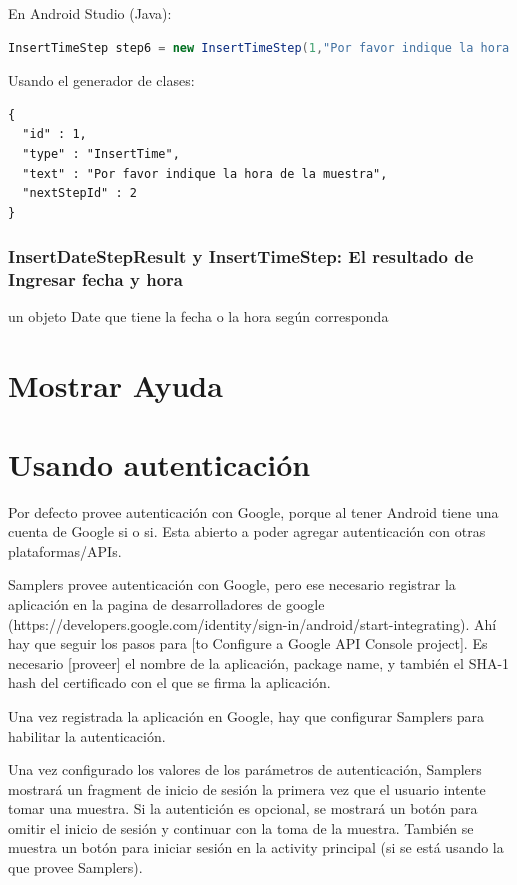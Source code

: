 En Android Studio (Java):
\begin{lstlisting}[language=Java, frame=tlb]	
InsertTimeStep step6 = new InsertTimeStep(1,"Por favor indique la hora de la muestra",2); 
\end{lstlisting}

Usando el generador de clases:
\begin{lstlisting}[language=XML, frame=tlb]	
{
  "id" : 1,
  "type" : "InsertTime",
  "text" : "Por favor indique la hora de la muestra",
  "nextStepId" : 2
}
\end{lstlisting}

\subsubsection{InsertDateStepResult y InsertTimeStep: El resultado de Ingresar fecha y hora}
un objeto Date que tiene la fecha o la hora según corresponda

\section{Mostrar Ayuda}

\section{Usando autenticación}
Por defecto provee autenticación con Google, porque al tener Android tiene una cuenta de Google si o si.
Esta abierto a poder agregar autenticación con otras plataformas/APIs.

Samplers provee autenticación con Google, pero ese necesario registrar la aplicación en la pagina de desarrolladores de google (https://developers.google.com/identity/sign-in/android/start-integrating). Ahí hay que seguir los pasos para [to Configure a Google API Console project]. Es necesario [proveer] el nombre de la aplicación, package name, y también el SHA-1 hash del certificado con el que se firma la aplicación.

Una vez registrada la aplicación en Google, hay que configurar Samplers para habilitar la autenticación.

Una vez configurado los valores de los parámetros de autenticación, Samplers mostrará un fragment de inicio de sesión la primera vez que el usuario intente tomar una muestra. Si la autentición es opcional, se mostrará un botón para omitir el inicio de sesión y continuar con la toma de la muestra. También se muestra un botón para iniciar sesión en la activity principal (si se está usando la que provee Samplers).


